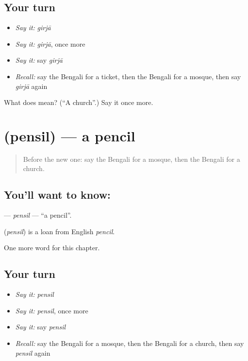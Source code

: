 \subsection*{Your turn}
\begin{itemize}
\raggedright
  \item \emph{Say it:} \emph{girjā}
  \item \emph{Say it:} \emph{girjā}, once more
  \item \emph{Say it:} say \emph{girjā}
  \item \emph{Recall:} say the Bengali for a ticket, then the Bengali for a mosque, then say \emph{girjā} again
\end{itemize}

\begin{tcolorbox}[breakable,colback=teal!4,colframe=teal!35!black,title={Before you move on}]
What does  mean? (\textquotedblleft{}A church\textquotedblright{}.) Say it once more.
\end{tcolorbox}
\section[\texorpdfstring{\bn{পেন্সিল} (pensil)}{পেন্সিল (pensil)}]{ (pensil) — a pencil}

\label{lesson:BN-C129-pensil}



\begin{quote}
Before the new one: say the Bengali for a mosque, then the Bengali for a church.
\end{quote}

\subsection*{You'll want to know: }
\textbf{} — \emph{pensil} — \textquotedblleft{}a pencil\textquotedblright{}.

\begin{cousinweb}
\textbf{} (\emph{pensil}) is a loan from English \emph{pencil}.
\end{cousinweb}

\begin{grammarlens}[title={What you've built}]
One more word for this chapter.
\end{grammarlens}

\subsection*{Your turn}
\begin{itemize}
\raggedright
  \item \emph{Say it:} \emph{pensil}
  \item \emph{Say it:} \emph{pensil}, once more
  \item \emph{Say it:} say \emph{pensil}
  \item \emph{Recall:} say the Bengali for a mosque, then the Bengali for a church, then say \emph{pensil} again
\end{itemize}

